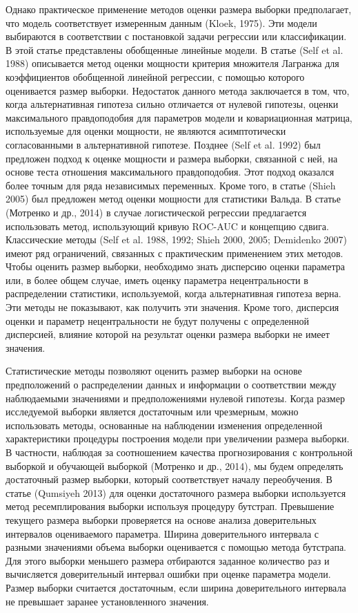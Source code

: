Однако практическое применение методов оценки размера выборки предполагает, что модель соответствует измеренным данным (Kloek, 1975). Эти модели выбираются в соответствии с постановкой задачи регрессии или классификации. В этой статье представлены обобщенные линейные модели. В статье (Self et al. 1988) описывается метод оценки мощности критерия множителя Лагранжа для коэффициентов обобщенной линейной регрессии, с помощью которого оценивается размер выборки. Недостаток данного метода заключается в том, что, когда альтернативная гипотеза сильно отличается от нулевой гипотезы, оценки максимального правдоподобия для параметров модели и ковариационная матрица, используемые для оценки мощности, не являются асимптотически согласованными в альтернативной гипотезе. Позднее (Self et al. 1992) был предложен подход к оценке мощности и размера выборки, связанной с ней, на основе теста отношения максимального правдоподобия. Этот подход оказался более точным для ряда независимых переменных. Кроме того, в статье (Shieh 2005) был предложен метод оценки мощности для статистики Вальда. В статье (Мотренко и др., 2014) в случае логистической регрессии предлагается использовать метод, использующий кривую ROC-AUC и концепцию сдвига. Классические методы (Self et al. 1988, 1992; Shieh 2000, 2005; Demidenko 2007) имеют ряд ограничений, связанных с практическим применением этих методов. Чтобы оценить размер выборки, необходимо знать дисперсию оценки параметра или, в более общем случае, иметь оценку параметра нецентральности в распределении статистики, используемой, когда альтернативная гипотеза верна. Эти методы не показывают, как получить эти значения. Кроме того, дисперсия оценки и параметр нецентральности не будут получены с определенной дисперсией, влияние которой на результат оценки размера выборки не имеет значения.

Статистические методы позволяют оценить размер выборки на основе предположений о распределении данных и информации о соответствии между наблюдаемыми значениями и предположениями нулевой гипотезы. Когда размер исследуемой выборки является достаточным или чрезмерным, можно использовать методы, основанные на наблюдении изменения определенной характеристики процедуры построения модели при увеличении размера выборки. В частности, наблюдая за соотношением качества прогнозирования с контрольной выборкой и обучающей выборкой (Мотренко и др., 2014), мы будем определять достаточный размер выборки, который соответствует началу переобучения. В статье (Qumsiyeh 2013) для оценки достаточного размера выборки используется метод ресемплирования выборки используя процедуру бутстрап. Превышение текущего размера выборки проверяется на основе анализа доверительных интервалов оцениваемого параметра. Ширина доверительного интервала с разными значениями объема выборки оценивается с помощью метода бутстрапа. Для этого выборки меньшего размера отбираются заданное количество раз и вычисляется доверительный интервал ошибки при оценке параметра модели. Размер выборки считается достаточным, если ширина доверительного интервала не превышает заранее установленного значения.

